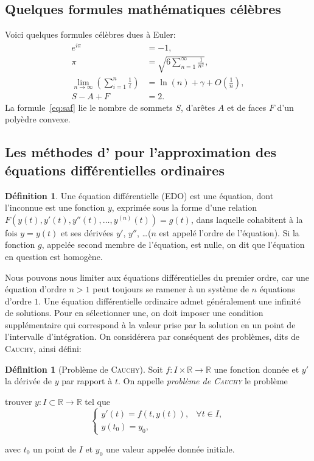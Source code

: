 \documentclass[a4paper,11pt]{article}
\theoremstyle{plain}
\theoremstyle{definition}
\newtheorem{defi}[thm]{Définition}
\theoremstyle{remark}
\newcommand{\ensemble}[1]{\mathbb{#1}}
\newcommand{\R}{\ensemble{R}}
\newcommand{\nom}[1]{\bsc{#1}\xspace}%
\newcommand{\euler}{\nom{Euler}}
\begin{document}
\subsection{Quelques formules mathématiques célèbres}

Voici quelques formules célèbres dues à Euler:
\begin{align}
e^{i\pi} &= -1,
\\
\pi &= \sqrt{ 6 \sum_{n=1}^\infty \frac{1}{n^2} },
\\
\lim_{n \to \infty} \left( \sum_{i=1}^n \frac{1}{i} \right) &= \ln(n) + \gamma + O\left(\frac{1}{n}\right),
\\
S-A+F &= 2. \label{eq:saf}
\end{align}
La formule~\eqref{eq:saf} lie le nombre de sommets $S$, d'arêtes $A$ et de faces $F$ d'un polyèdre convexe.



\subsection{Les méthodes d'\euler pour l'approximation des équations différentielles ordinaires}

\begin{defi}
Une équation différentielle (EDO) est une équation, dont l'inconnue est une fonction $y$, exprimée sous la forme d'une relation $F(y(t),y'(t),y''(t),\dots,y^{(n)}(t))=g(t)$, dans laquelle cohabitent à la fois $y=y(t)$ et ses dérivées $y'$, $y''$, \dots ($n$ est appelé l'ordre de l'équation). Si la fonction $g$, appelée \og second membre\fg{} de l'équation, est nulle, on dit que l'équation en question est homogène. 
\end{defi}

Nous pouvons nous limiter aux équations différentielles du premier ordre, car une équation d'ordre $n>1$ peut toujours se ramener à un système de $n$ équations d'ordre $1$. Une équation différentielle ordinaire admet généralement une infinité de solutions. Pour en sélectionner une, on doit imposer une condition supplémentaire qui correspond à la valeur prise par la solution en un point de l'intervalle d'intégration. On considérera par conséquent des problèmes, dits de \textsc{Cauchy}, ainsi défini:
\begin{defi}[Problème de \textsc{Cauchy}]
Soit $f \colon I \times \R \to \R$ une fonction donnée et $y'$ la dérivée de $y$ par rapport à $t$. On appelle \emph{problème de \textsc{Cauchy}} le problème
\begin{center}
trouver $y \colon I\subset \R \to \R$ tel que
\begin{equation}\label{eq:cauchy}
\begin{cases}
y'(t) = f(t,y(t)), &\forall t \in I,\\
y(t_0) = y_0,
\end{cases}
\end{equation}
\end{center}
avec $t_0$ un point de $I$ et $y_0$ une valeur appelée donnée initiale.
\end{defi}
\end{document}
